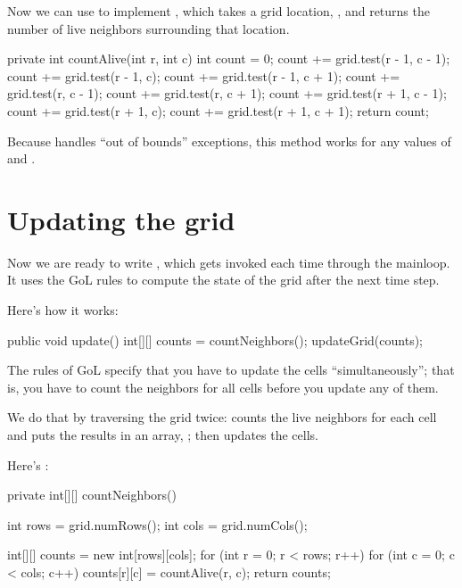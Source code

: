 Now we can use  to implement , which takes a grid location, , and returns the number of live neighbors surrounding that location.

\begin{code}
private int countAlive(int r, int c) {
    int count = 0;
    count += grid.test(r - 1, c - 1);
    count += grid.test(r - 1, c);
    count += grid.test(r - 1, c + 1);
    count += grid.test(r, c - 1);
    count += grid.test(r, c + 1);
    count += grid.test(r + 1, c - 1);
    count += grid.test(r + 1, c);
    count += grid.test(r + 1, c + 1);
    return count;
}
\end{code}

Because  handles ``out of bounds'' exceptions, this method works for any values of  and .


\section{Updating the grid}
\label{sec:update}

Now we are ready to write , which gets invoked each time through the mainloop.
It uses the GoL rules to compute the state of the grid after the next time step.

Here's how it works:

\begin{code}
public void update() {
    int[][] counts = countNeighbors();
    updateGrid(counts);
}
\end{code}

The rules of GoL specify that you have to update the cells ``simultaneously''; that is, you have to count the neighbors for all cells before you update any of them.

We do that by traversing the grid twice:  counts the live neighbors for each cell and puts the results in an array, ; then  updates the cells.

Here's :

\begin{code}
private int[][] countNeighbors() {
    int rows = grid.numRows();
    int cols = grid.numCols();

    int[][] counts = new int[rows][cols];
    for (int r = 0; r < rows; r++) {
        for (int c = 0; c < cols; c++) {
            counts[r][c] = countAlive(r, c);
        }
    }
    return counts;
}
\end{code}

